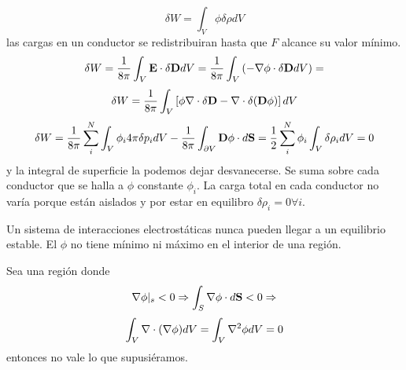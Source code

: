 \documentclass[10pt,oneside]{CBFT_book}
\begin{document}
\[
	\delta W = \int_V \phi \delta \rho dV 
\]
las cargas en un conductor se redistribuiran hasta que $F$ alcance su valor mínimo.
\[
	\delta W = \frac{1}{8\pi} \int_V \vb{E}\cdot\delta\vb{D} dV = \frac{1}{8\pi} \int_V \left( 
-\Nabla\phi\cdot\delta\vb{D}  dV \right)  = 
\]
\[
	\delta W = \frac{1}{8\pi} \int_V \left[ \phi \Nabla\cdot\delta\vb{D} - 
			\Nabla\cdot\delta(\vb{D}\phi) \right] dV
\]
\[
	\delta W = \frac{1}{8\pi} \sum_i^N \int_V \phi_i 4\pi \delta p_i dV - 
		\frac{1}{8\pi} \int_{\partial V} \vb{D}\phi \cdot d\vb{S} =
		\frac{1}{2} \sum_i^N  \phi_i \int_V \delta \rho_i dV = 0
\]
y la integral de superficie la podemos dejar desvanecerse. Se suma sobre cada conductor 
que se halla a $\phi$ constante $\phi_i$.
La carga total en cada conductor no varía porque están aislados y por estar en 
equilibro $\delta \rho_i = 0 \forall i$.

Un sistema de interacciones electrostáticas nunca pueden llegar a un equilibrio estable.
El $\phi$ no tiene mínimo ni máximo en el interior de una región.

Sea una región donde 
\[
	\Nabla\phi |_s < 0 \Rightarrow \int_S \Nabla\phi\cdot d\vb{S} < 0 \Rightarrow
\]
\[
	\int_V \mathbf{\nabla}\cdot(\mathbf{\nabla}\phi) dV = \int_V \nabla^2 \phi dV = 0
\]
entonces no vale lo que supusiéramos.



\end{document}
